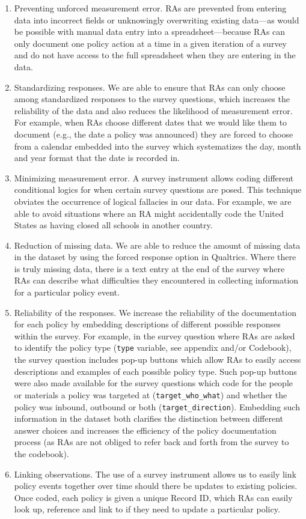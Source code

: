 \documentclass[]{article}
\begin{document}
\begin{enumerate}
\def\labelenumi{\arabic{enumi}.}
\item
  Preventing unforced measurement error. RAs are prevented from entering data into incorrect fields or unknowingly overwriting existing data---as would be possible with manual data entry into a spreadsheet---because RAs can only document one policy action at a time in a given iteration of a survey and do not have access to the full spreadsheet when they are entering in the data.
\item
  Standardizing responses. We are able to ensure that RAs can only choose among standardized responses to the survey questions, which increases the reliability of the data and also reduces the likelihood of measurement error. For example, when RAs choose different dates that we would like them to document (e.g., the date a policy was announced) they are forced to choose from a calendar embedded into the survey which systematizes the day, month and year format that the date is recorded in.
\item
  Minimizing measurement error. A survey instrument allows coding different conditional logics for when certain survey questions are posed. This technique obviates the occurrence of logical fallacies in our data. For example, we are able to avoid situations where an RA might accidentally code the United States as having closed all schools in another country.
\item
  Reduction of missing data. We are able to reduce the amount of missing data in the dataset by using the forced response option in Qualtrics. Where there is truly missing data, there is a text entry at the end of the survey where RAs can describe what difficulties they encountered in collecting information for a particular policy event.
\item
  Reliability of the responses. We increase the reliability of the documentation for each policy by embedding descriptions of different possible responses within the survey. For example, in the survey question where RAs are asked to identify the policy type (\texttt{type} variable, see appendix and/or Codebook), the survey question includes pop-up buttons which allow RAs to easily access descriptions and examples of each possible policy type. Such pop-up buttons were also made available for the survey questions which code for the people or materials a policy was targeted at (\texttt{target\_who\_what}) and whether the policy was inbound, outbound or both (\texttt{target\_direction}). Embedding such information in the dataset both clarifies the distinction between different answer choices and increases the efficiency of the policy documentation process (as RAs are not obliged to refer back and forth from the survey to the codebook).
\item
  Linking observations. The use of a survey instrument allows us to easily link policy events together over time should there be updates to existing policies. Once coded, each policy is given a unique Record ID, which RAs can easily look up, reference and link to if they need to update a particular policy.
\end{enumerate}
\end{document}
